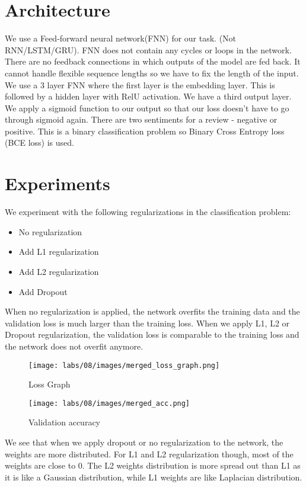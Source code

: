\section{Architecture}
We use a Feed-forward neural network(FNN) for our task. (Not RNN/LSTM/GRU). FNN does not contain any cycles or loops in the network. There are no feedback connections in which outputs of the model are fed back. It cannot handle flexible sequence lengths so we have to fix the length of the input. We use a 3 layer FNN where the first layer is the embedding layer. This is followed by a hidden layer with RelU activation. We have a third output layer. We apply a sigmoid function to our output so that our loss doesn't have to go through sigmoid again.
There are two sentiments for a review - negative or positive. This is a binary classification problem so Binary Cross Entropy loss (BCE loss) is used.

\section{Experiments}
We experiment with the following regularizations in the classification problem:
\begin{itemize}
    \item No regularization
    \item Add L1 regularization
    \item Add L2 regularization
    \item Add Dropout
\end{itemize}
When no regularization is applied, the network overfits the training data and the validation loss is much larger than the training loss. When we apply L1, L2 or Dropout regularization, the validation loss is comparable to the training loss and the network does not overfit anymore.

\begin{figure}
    \centering
    \texttt{[image: labs/08/images/merged\_loss\_graph.png]}
        \caption{Loss Graph}
        \label{fig:Loss Graph}
\end{figure}

\begin{figure}
    \centering
    \texttt{[image: labs/08/images/merged\_acc.png]}
        \caption{Validation accuracy}
        \label{fig:Validation accuracy}
\end{figure}

We see that when we apply dropout or no regularization to the network, the weights are more distributed. For L1 and L2 regularization though, most of the weights are close to 0. The L2 weights distribution is more spread out than L1 as it is like a Gaussian distribution, while L1 weights are like Laplacian distribution.

